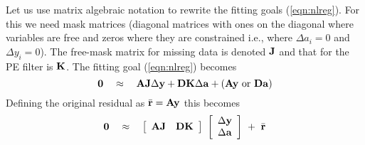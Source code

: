 \par
Let us use matrix algebraic notation to rewrite the fitting goals
(\ref{eqn:nlreg}).
For this we need mask matrices
(diagonal matrices with ones on the diagonal 
where variables are free and zeros where they are constrained
i.e., where $\Delta  a_i=0$ and $\Delta  y_i=0$).
The free-mask matrix for missing data is denoted $\bold J$
and that for the PE filter is $\bold K$.
The fitting goal (\ref{eqn:nlreg}) becomes
\begin{equation}
\bold 0
\quad \approx \quad
\bold A \bold J \Delta \bold y
+
\bold D \bold K \Delta \bold a
+
( \bold A \bold y   {\rm \ or \  }
  \bold D \bold a )
\label{eqn:nlreg2}
\end{equation}
Defining the original residual as
$\bar {\bold r} = \bold A\bold y$ this becomes
\begin{equation}
 \bold 0
 \quad\approx\quad
 \left[
 \begin{array}{cc}
   \bold A \bold J   &   \bold D \bold K 
 \end{array}
 \right]
 \
 \left[
 \begin{array}{c}
   \Delta \bold y \\
   \Delta \bold a
 \end{array}
 \right]
 \ +\ \bar {\bold r}
\end{equation}

